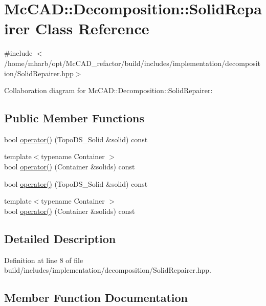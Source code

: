 \hypertarget{classMcCAD_1_1Decomposition_1_1SolidRepairer}{}\section{Mc\+C\+AD\+:\+:Decomposition\+:\+:Solid\+Repairer Class Reference}
\label{classMcCAD_1_1Decomposition_1_1SolidRepairer}


{\ttfamily \#include $<$/home/mharb/opt/\+Mc\+C\+A\+D\+\_\+refactor/build/includes/implementation/decomposition/\+Solid\+Repairer.\+hpp$>$}



Collaboration diagram for Mc\+C\+AD\+:\+:Decomposition\+:\+:Solid\+Repairer\+:
\subsection*{Public Member Functions}
\begin{DoxyCompactItemize}
\item 
bool \hyperlink{classMcCAD_1_1Decomposition_1_1SolidRepairer_a15d9d3012719eff5c3ff33baf7859ad6}{operator()} (Topo\+D\+S\+\_\+\+Solid \&solid) const
\item 
{\footnotesize template$<$typename Container $>$ }\\bool \hyperlink{classMcCAD_1_1Decomposition_1_1SolidRepairer_a3d721f81f2649ad178fc07cbc65dd6bc}{operator()} (Container \&solids) const
\item 
bool \hyperlink{classMcCAD_1_1Decomposition_1_1SolidRepairer_a15d9d3012719eff5c3ff33baf7859ad6}{operator()} (Topo\+D\+S\+\_\+\+Solid \&solid) const
\item 
{\footnotesize template$<$typename Container $>$ }\\bool \hyperlink{classMcCAD_1_1Decomposition_1_1SolidRepairer_a3d721f81f2649ad178fc07cbc65dd6bc}{operator()} (Container \&solids) const
\end{DoxyCompactItemize}


\subsection{Detailed Description}


Definition at line 8 of file build/includes/implementation/decomposition/\+Solid\+Repairer.\+hpp.



\subsection{Member Function Documentation}
\mbox{\label{classMcCAD_1_1Decomposition_1_1SolidRepairer_a15d9d3012719eff5c3ff33baf7859ad6}} 
